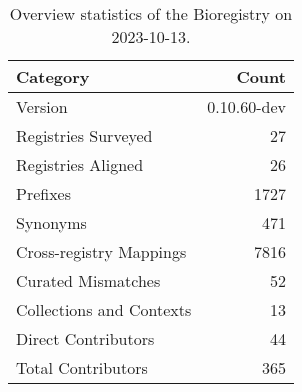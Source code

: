 \begin{table}
\caption{Overview statistics of the Bioregistry on 2023-10-13.}
\label{tab:bioregistry-summary}
\begin{tabular}{lr}
\toprule
Category & Count \\
\midrule
Version & 0.10.60-dev \\
Registries Surveyed & 27 \\
Registries Aligned & 26 \\
Prefixes & 1727 \\
Synonyms & 471 \\
Cross-registry Mappings & 7816 \\
Curated Mismatches & 52 \\
Collections and Contexts & 13 \\
Direct Contributors & 44 \\
Total Contributors & 365 \\
\bottomrule
\end{tabular}
\end{table}
